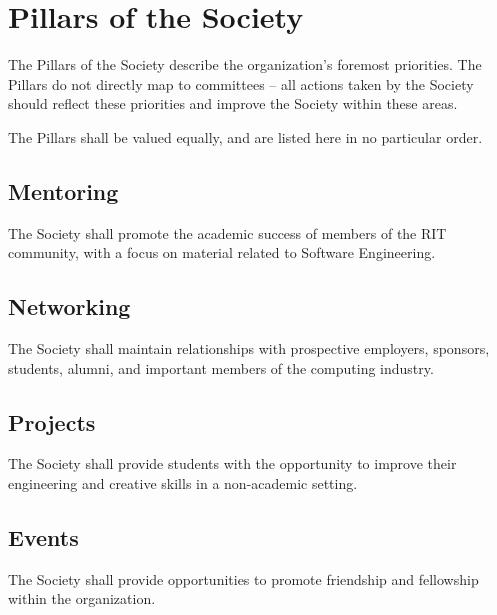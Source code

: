 \documentclass[american]{article}
\begin{document}
\section{Pillars of the Society}

The Pillars of the Society describe the organization's foremost priorities. The Pillars do not directly map to committees -- all actions taken by the Society should reflect these priorities and improve the Society within these areas.

The Pillars shall be valued equally, and are listed here in no particular order.

\subsection{Mentoring}
The Society shall promote the academic success of members of the RIT community, with a focus on material related to Software Engineering.

\subsection{Networking}
The Society shall maintain relationships with prospective employers, sponsors, students, alumni, and important members of the computing industry.

\subsection{Projects}
The Society shall provide students with the opportunity to improve their engineering and creative skills in a non-academic setting.

\subsection{Events}
The Society shall provide opportunities to promote friendship and fellowship within the organization.
\end{document}
